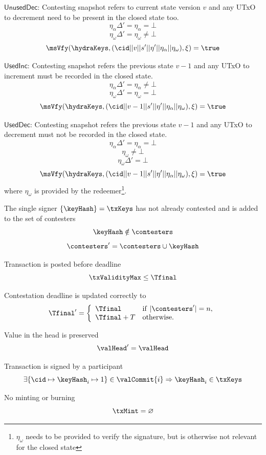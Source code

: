 \begin{menumerate}
\begin{menumerate}
	\item $\mathsf{UnusedDec}$: Contesting snapshot refers to current state version $v$ and any UTxO to decrement need to be present in the closed state too.
	\[
	  \eta_\alpha\Delta' = \eta_\alpha = \bot
	\]
	\[
	  \eta_\omega\Delta' = \eta_\omega \neq \bot
	\]
	\[
	  \msVfy(\hydraKeys,(\cid || v || s' || \eta' || \eta_\alpha|| \eta_\omega),\xi) = \true
	\]
	  \item $\mathsf{UsedInc}$: Contesting snapshot refers the previous state $v - 1$ and any UTxO to increment must be recorded in the closed state.
	  \[
		\eta_\alpha\Delta' = \eta_\alpha \neq \bot
	  \]
	  \[
	    \eta_\omega\Delta' = \eta_\omega = \bot
	  \]
	  \[
		\msVfy(\hydraKeys,(\cid || v - 1 || s' || \eta' || \eta_\alpha || \eta_\omega ),\xi) = \true
	  \]

	\item $\mathsf{UsedDec}$: Contesting snapshot refers the previous state $v - 1$ and any UTxO to decrement must not be recorded in the closed state.
	  \[
		\eta_\alpha\Delta' = \eta_\alpha = \bot
	  \]
	  \[ 
	    \eta_\omega \neq  \bot
	  \]
	  \[ 
	    \eta_\omega\Delta' = \bot
	  \]
	\[
	  \msVfy(\hydraKeys,(\cid || v - 1 || s' || \eta' || \eta_\alpha|| \eta_\omega),\xi) = \true
	\]
	where $\eta_\omega$ is provided by the redeemer\footnote{$\eta_\omega$ needs to be provided to verify the signature, but is otherwise not relevant for the closed state}.
  \end{menumerate}

  \item The single signer $\{\keyHash\} = \txKeys$ has not already contested and is added to the set of contesters
  \[
	\keyHash \notin \contesters
  \]
  \[
	\contesters' = \contesters \cup \keyHash
  \]
  \item Transaction is posted before deadline
  \[
	\txValidityMax \leq \Tfinal
  \]
  \item Contestation deadline is updated correctly to
  \[
	\Tfinal' = \left\{\begin{array}{ll}
	  \Tfinal     & \mathrm{if} ~ |\contesters'| = n, \\
	  \Tfinal + T & \mathrm{otherwise.}
	\end{array}\right.
\]
\item Value in the head is preserved
\[
  \valHead' = \valHead
\]
\item Transaction is signed by a participant
\[
  \exists \{\cid \mapsto \keyHash_{i} \mapsto 1\} \in \valCommit{i} \Rightarrow \keyHash_{i} \in \txKeys
\]
\item No minting or burning
\[
  \txMint = \varnothing
\]
\end{menumerate}

